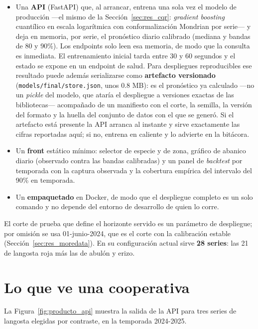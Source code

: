 \begin{itemize}
  \item Una \textbf{API} (FastAPI) que, al arrancar, entrena una sola vez el modelo de
  producción ---el mismo de la Sección~\ref{sec:res_cqr}: \emph{gradient boosting} cuantílico
  en escala logarítmica con conformalización Mondrian por serie--- y deja en memoria, por serie,
  el pronóstico diario calibrado (mediana y bandas de 80 y 90\%). Los endpoints solo leen esa
  memoria, de modo que la consulta es inmediata. El entrenamiento inicial tarda entre 30 y 60
  segundos y el estado se expone en un endpoint de salud. Para despliegues reproducibles ese
  resultado puede además serializarse como \textbf{artefacto versionado}
  (\texttt{models/final/store.json}, unos 0.8 MB): es el pronóstico ya calculado ---no un
  \emph{pickle} del modelo, que ataría el despliegue a versiones exactas de las bibliotecas---
  acompañado de un manifiesto con el corte, la semilla, la versión del formato y la huella del
  conjunto de datos con el que se generó. Si el artefacto está presente la API arranca al
  instante y sirve exactamente las cifras reportadas aquí; si no, entrena en caliente y lo
  advierte en la bitácora.
  \item Un \textbf{front} estático mínimo: selector de especie y de zona, gráfico de abanico
  diario (observado contra las bandas calibradas) y un panel de \emph{backtest} por temporada
  con la captura observada y la cobertura empírica del intervalo del 90\% en temporada.
  \item Un \textbf{empaquetado} en Docker, de modo que el despliegue completo es un solo
  comando y no depende del entorno de desarrollo de quien lo corre.
\end{itemize}

El corte de prueba que define el horizonte servido es un parámetro de despliegue; por omisión se
usa 01-junio-2024, que es el corte con la calibración estable
(Sección~\ref{sec:res_moredata}). En su configuración actual sirve \textbf{28 series}: las 21 de
langosta roja más las de abulón y erizo.

\section{Lo que ve una cooperativa}

La Figura~\ref{fig:producto_api} muestra la salida de la API para tres series de langosta
elegidas por contraste, en la temporada 2024-2025.

